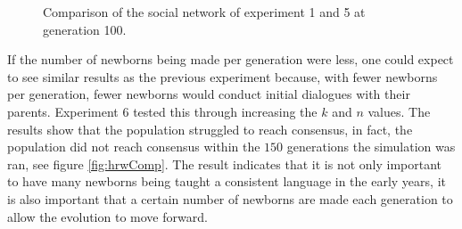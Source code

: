 \begin{figure}
    \centering
    \hfill
    \caption{Comparison of the social network of experiment 1 and 5 at generation 100.}
    \label{SNcomp15}
\end{figure}

If the number of newborns being made per generation were less, one could expect to see similar results as the previous experiment because, with fewer newborns per generation, fewer newborns would conduct initial dialogues with their parents. Experiment 6 tested this through increasing the $k$ and $n$ values. The results show that the population struggled to reach consensus, in fact, the population did not reach consensus within the $150$ generations the simulation was ran, see figure \ref{fig:hrwComp}. The result indicates that it is not only important to have many newborns being taught a consistent language in the early years, it is also important that a certain number of newborns are made each generation to allow the evolution to move forward. 

